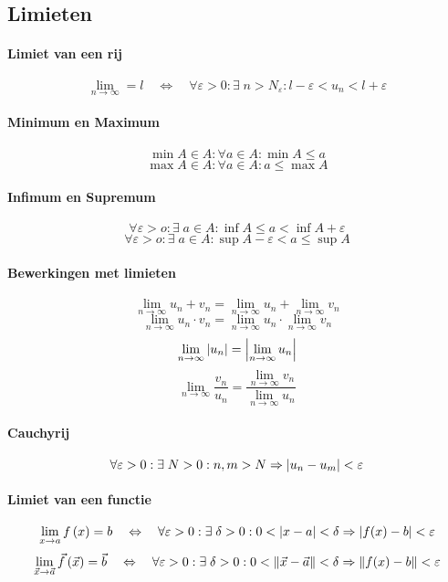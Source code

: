 \subsection{Limieten}
\label{sec:Limieten}

\paragraph{Limiet van een rij}
\[
  \lim_{n \to \infty} = l 
  \quad \Leftrightarrow \quad
  \forall \varepsilon > 0 : \exists\; n > N_\varepsilon : l - \varepsilon< u_n < l + \varepsilon
\]

\paragraph{Minimum en Maximum}
\[
  \min A \in A : \forall a \in A : \min A \leq a
\]
\[
  \max A \in A : \forall a \in A : a \leq \max A
\]

\paragraph{Infimum en Supremum}
\[
  \forall \varepsilon > o : \exists\; a \in A :  \inf A \leq a < \inf A + \varepsilon
\]
\[
  \forall \varepsilon > o : \exists\; a \in A :  \sup A  - \varepsilon < a \leq \sup A
\]

\paragraph{Bewerkingen met limieten}
\[
  \lim_{n \to \infty} u_n + v_n = \lim_{n \to \infty} u_n + \lim_{n \to \infty} v_n
\]
\[
  \lim_{n \to \infty} u_n \cdot v_n = \lim_{n \to \infty} u_n \cdot \lim_{n \to \infty} v_n
\]
\[
  \lim_{n \to \infty} \left| u_n \right| = \left| \lim_{n \to \infty} u_n \right|
\]
\[
  \lim_{n \to \infty} \frac{v_n}{u_n} = \frac{\lim_{n \to \infty} v_n}{\lim_{n \to \infty} u_n}
\]

\paragraph{Cauchyrij}
\[
  \forall \varepsilon > 0 : \exists\; N > 0 : n,m > N \Rightarrow \abs{u_n-u_m} < \varepsilon
\]

\paragraph{Limiet van een functie}
\[
  \lim_{x \to a} f\left(x\right) = b 
  \quad \Leftrightarrow \quad
  \forall \varepsilon > 0 : \exists\; \delta > 0 : 0 < \abs{x-a} < \delta 
                            \Rightarrow \abs{f(x) - b} < \varepsilon
\]
\[
  \lim_{\vec{x} \to \vec{a}} \vec{f}\left(\vec{x}\right) = \vec{b} 
  \quad \Leftrightarrow \quad
  \forall \varepsilon > 0 : \exists\; \delta > 0 : 0 < \norm{\vec{x} - \vec{a}} < \delta 
                            \Rightarrow \norm{f(x) - b} < \varepsilon
\]

